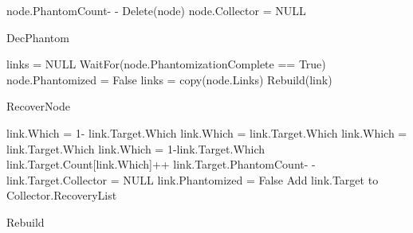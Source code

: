 \setlength{\textfloatsep}{0pt}
\begin{algorithm}[H]
	\scriptsize
	
		\begin{algorithmic}[1]
{}
\State node.PhantomCount- -
\State Delete(node)
\Else
\State node.Collector = NULL
\EndIf
\EndIf
{}
\EndProcedure
\caption{DecPhantom}
\label{single:algorithm:decPhantom}
\end{algorithmic}
\end{algorithm}
\setlength{\textfloatsep}{0pt}



\begin{algorithm}[H]
	\scriptsize
	
		\begin{algorithmic}[1]
{}
\State links = NULL
\State WaitFor(node.PhantomizationComplete == True)
\State node.Phantomized = False
\State links = copy(node.Links)
\EndIf
{}
\State Rebuild(link)
\EndFor
\EndProcedure
\caption{RecoverNode}
\label{algorithm:recover}
\end{algorithmic}
\end{algorithm}
\setlength{\textfloatsep}{0pt}



\begin{algorithm}[H]
	\scriptsize
	
		\begin{algorithmic}[1]
{}
\State link.Which = 1- link.Target.Which
\State link.Which = link.Target.Which
\State link.Which = link.Target.Which
\Else
\State link.Which = 1-link.Target.Which
\EndIf
\State link.Target.Count[link.Which]++
\State link.Target.PhantomCount- -
\State link.Target.Collector = NULL
\EndIf
\State link.Phantomized = False 
\State Add link.Target to Collector.RecoveryList
\EndIf
{}
 \EndProcedure
\caption{Rebuild}
\label{single:algorithm:rebuild}

\end{algorithmic}
\end{algorithm}
\setlength{\textfloatsep}{0pt}


